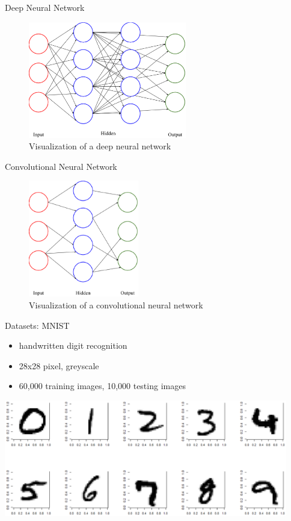\documentclass{beamer}
\begin{document}
  \begin{frame}{Deep Neural Network}
    \begin{figure}[ht!]
      \centering
      \includegraphics[height=2in]{../figures/deep_nn.eps}
      \caption{Visualization of a deep neural network}
      \label{fig:dnn}
    \end{figure}
  \end{frame}

  \begin{frame}{Convolutional Neural Network}
    \begin{figure}[ht!]
      \centering
      \includegraphics[height=2in]{../figures/convolutional_nn.eps}
      \caption{Visualization of a convolutional neural network}
      \label{fig:cnn}
    \end{figure}
  \end{frame}

  \begin{frame}{Datasets: MNIST}
    \begin{itemize}
      \item handwritten digit recognition
      \item 28x28 pixel, greyscale
      \item 60,000 training images, 10,000 testing images
    \end{itemize}
    \begin{center}
      \includegraphics[height=2in]{../figures/mnist.eps}
    \end{center}
  \end{frame}
\end{document}
